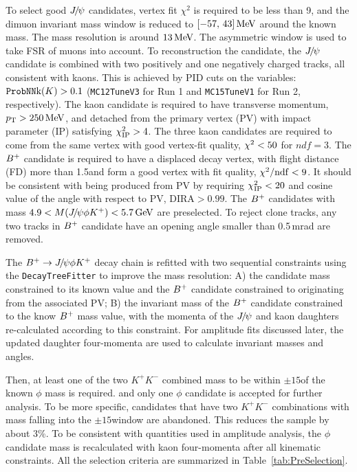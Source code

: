 %
To select good ${{J\mskip -3mu/\mskip -2mu\psi}}$ candidates, 
vertex fit $\chi^2$ is required to be less than 9, 
and the dimuon invariant mass window is reduced to $[-57,\,43]\text{\,Me\kern -0.1em V}$ around the known \jpsi mass\supercite{PDG}.
The \jpsi mass resolution is around $13\text{\,Me\kern -0.1em V}$.  
The asymmetric window is used to take FSR of muons into account.
To reconstruction the \Bp candidate, 
the ${{J\mskip -3mu/\mskip -2mu\psi}}$ candidate is combined with two positively and one negatively charged tracks, 
all consistent with kaons.
This is achieved by PID cuts on the \ProbNN variables: $\mbox{\texttt{ProbNN}}{\rm k}(K)>0.1$ (\texttt{MC12TuneV3} for Run 1 and \texttt{MC15TuneV1} for Run 2, respectively). 
The kaon candidate is required to have transverse  momentum, 
$p_{\mathrm{T}}>250\text{\,Me\kern -0.1em V}$, and detached from the primary vertex (PV) with impact parameter (IP) satisfying $\chi^2_{\text{IP}}>4$. 
The three kaon candidates are required to come from the same vertex with good vertex-fit quality, $\chi^2<50$ for $ndf=3$.
The ${{{B}^+}}$ candidate is required to have a displaced decay vertex, 
with flight distance (FD) more than 1.5\mm and  form a good vertex with fit quality, $\chi^2/\mathrm{ndf}<9$.
It should be consistent with being produced from PV by requiring $\chi^2_{\text{IP}}<20$ and cosine value of the angle with respect to PV, DIRA$>0.99$. 
The ${{{B}^+}}$ candidates with mass $4.9<M({{J\mskip -3mu/\mskip -2mu\psi}} \phi {\ensuremath{{K}^+}})<5.7 \text{\,Ge\kern -0.1em V}$ are preselected.  
To reject clone tracks, 
any two tracks in ${{{B}^+}}$ candidate have an opening angle smaller than 0.5\,mrad are removed. 

The ${{{B}^+}}\rightarrow{\ensuremath{{J\mskip -3mu/\mskip -2mu\psi}}}\phi{\ensuremath{{K}^+}}$ decay chain is refitted with two sequential constraints using the \texttt{DecayTreeFitter} to improve the mass resolution: 
A) the \jpsi candidate mass constrained to its known value\supercite{PDG} and 
the ${{{B}^+}}$ candidate constrained to originating from the associated PV; 
B) the invariant mass of the ${{{B}^+}}$ candidate constrained to  the know ${{{B}^+}}$ mass value\supercite{PDG}, 
with the momenta of the ${{J\mskip -3mu/\mskip -2mu\psi}}$ and kaon daughters re-calculated according to this constraint. 
For amplitude fits discussed later, 
the updated daughter four-momenta are used to calculate invariant masses and angles.  

Then, 
at least one of the two $K^+K^-$ combined mass to be within $\pm15$\mev of the known $\phi$ mass is required\supercite{PDG}.
and only one $\phi$ candidate is accepted for further analysis. 
To be more specific, 
candidates that have two $K^+K^-$ combinations with mass falling into the $\pm15$\mev window are abandoned. 
This reduces the sample by about 3\%. 
To be consistent with quantities used in amplitude analysis, 
the $\phi$ candidate mass is recalculated with kaon four-momenta after all kinematic constraints. 
All the selection criteria are summarized in Table~\ref{tab:PreSelection}. 

